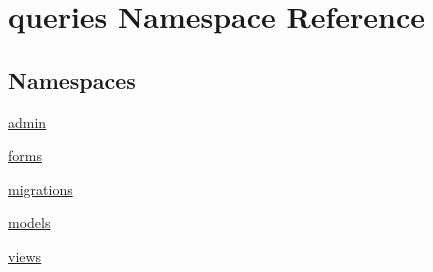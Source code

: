\hypertarget{namespacequeries}{\section{queries Namespace Reference}
\label{namespacequeries}
}
\subsection*{Namespaces}
\begin{DoxyCompactItemize}
\item 
\hyperlink{namespacequeries_1_1admin}{admin}
\item 
\hyperlink{namespacequeries_1_1forms}{forms}
\item 
\hyperlink{namespacequeries_1_1migrations}{migrations}
\item 
\hyperlink{namespacequeries_1_1models}{models}
\item 
\hyperlink{namespacequeries_1_1views}{views}
\end{DoxyCompactItemize}
